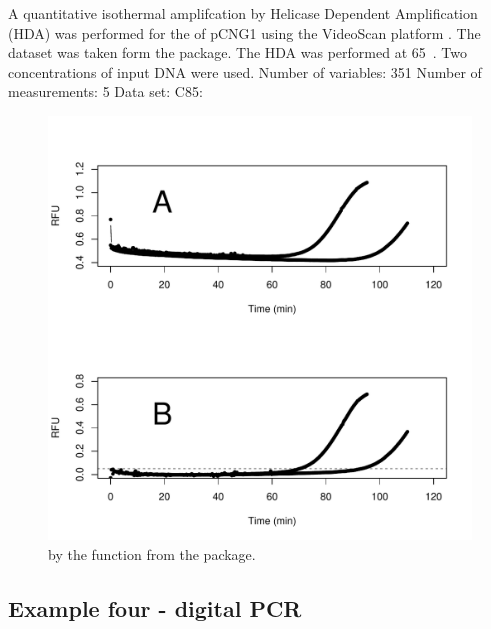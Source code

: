 A quantitative isothermal amplifcation by Helicase Dependent Amplification (HDA) 
was performed for the of pCNG1 using the VideoScan platform 
\citep{rodiger_highly_2013}. The dataset was taken form the  
package. The HDA was performed at 65~\textcelsius. Two concentrations of input 
DNA were used. Number of variables: 351 Number of measurements: 5 Data set: C85:


\begin{figure}[htbp]
  \centering
  \includegraphics[clip=true, width=16cm]{figures/qIA.pdf}
  \caption{by the  function from the  package.}
  \label{figure:qIA}
\end{figure}


\subsection{Example four - digital PCR}

